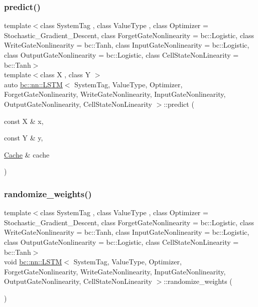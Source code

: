 \subsubsection{\texorpdfstring{predict()}{predict()}}
{\footnotesize\ttfamily template$<$class System\+Tag , class Value\+Type , class Optimizer  = Stochastic\+\_\+\+Gradient\+\_\+\+Descent, class Forget\+Gate\+Nonlinearity  = bc\+::\+Logistic, class Write\+Gate\+Nonlinearity  = bc\+::\+Tanh, class Input\+Gate\+Nonlinearity  = bc\+::\+Logistic, class Output\+Gate\+Nonlinearity  = bc\+::\+Logistic, class Cell\+State\+Non\+Linearity  = bc\+::\+Tanh$>$ \\
template$<$class X , class Y $>$ \\
auto \hyperlink{structbc_1_1nn_1_1LSTM}{bc\+::nn\+::\+L\+S\+TM}$<$ System\+Tag, Value\+Type, Optimizer, Forget\+Gate\+Nonlinearity, Write\+Gate\+Nonlinearity, Input\+Gate\+Nonlinearity, Output\+Gate\+Nonlinearity, Cell\+State\+Non\+Linearity $>$\+::predict (\begin{DoxyParamCaption}\item[{const X \&}]{x,  }\item[{const Y \&}]{y,  }\item[{\hyperlink{structbc_1_1nn_1_1Cache}{Cache} \&}]{cache }\end{DoxyParamCaption})\hspace{0.3cm}{\ttfamily [inline]}}

\mbox{\label{structbc_1_1nn_1_1LSTM_a6364991b3bdf2d2364c90fdcd7a63c3a}} 
\subsubsection{\texorpdfstring{randomize\+\_\+weights()}{randomize\_weights()}}
{\footnotesize\ttfamily template$<$class System\+Tag , class Value\+Type , class Optimizer  = Stochastic\+\_\+\+Gradient\+\_\+\+Descent, class Forget\+Gate\+Nonlinearity  = bc\+::\+Logistic, class Write\+Gate\+Nonlinearity  = bc\+::\+Tanh, class Input\+Gate\+Nonlinearity  = bc\+::\+Logistic, class Output\+Gate\+Nonlinearity  = bc\+::\+Logistic, class Cell\+State\+Non\+Linearity  = bc\+::\+Tanh$>$ \\
void \hyperlink{structbc_1_1nn_1_1LSTM}{bc\+::nn\+::\+L\+S\+TM}$<$ System\+Tag, Value\+Type, Optimizer, Forget\+Gate\+Nonlinearity, Write\+Gate\+Nonlinearity, Input\+Gate\+Nonlinearity, Output\+Gate\+Nonlinearity, Cell\+State\+Non\+Linearity $>$\+::randomize\+\_\+weights (\begin{DoxyParamCaption}{ }\end{DoxyParamCaption})\hspace{0.3cm}{\ttfamily [inline]}}

